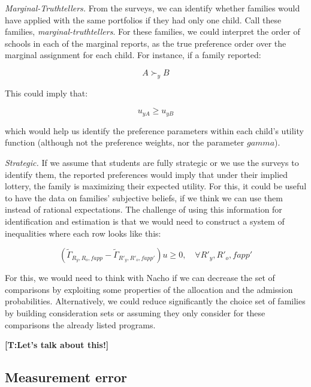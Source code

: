 \documentclass{article}
\newcommand{\tomas}[1]{{\color{red}\textbf{[T:#1]}}}
\begin{document}
\textit{Marginal-Truthtellers.} From the surveys, we can identify whether families would have applied with the same portfolios if they had only one child. Call these families, \textit{marginal-truthtellers}. For these families, we could interpret the order of schools in each of the marginal reports, as the true preference order over the marginal assignment for each child. For instance, if a family reported:

\begin{equation}
    A \succ_y B 
\end{equation}

This could imply that:

\begin{equation}
    u_{yA} \geq u_{yB}  
\end{equation}

which would help us identify the preference parameters within each child's utility function (although not the preference weights, nor the parameter $gamma$).

\textit{Strategic.} If we assume that students are fully strategic or we use the surveys to identify them, the reported preferences would imply that under their implied lottery, the family is maximizing their expected utility. For this, it could be useful to have the data on families' subjective beliefs, if we think we can use them instead of rational expectations. The challenge of using this information for identification and estimation is that we would need to construct a system of inequalities where each row looks like this:

\begin{equation}
    \left( \tilde{\Gamma}_{R_y, R_o, fapp} -  \tilde{\Gamma}_{R'_y, R'_o, fapp'} \right) u \geq 0, \quad \forall R'_y, R'_o, fapp'
\end{equation}

For this, we would need to think with Nacho if we can decrease the set of comparisons by exploiting some properties of the allocation and the admission probabilities. Alternatively, we could reduce significantly the choice set of families by building consideration sets or assuming they only consider for these comparisons the already listed programs.

\tomas{Let's talk about this!}

\subsection{Measurement error}
\end{document}
